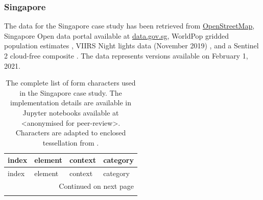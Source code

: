 \subsubsection{Singapore}
The data for the Singapore case study has been retrieved from
\href{https://osm.org}{OpenStreetMap}, Singapore Open data portal available at
\href{https://data.gov.sg/}{data.gov.sg}, WorldPop gridded population estimates
\citep{bondarenko2020census}, VIIRS Night lights data (November 2019) \citep{elvidge2013viirs},
and a Sentinel 2 cloud-free composite \citep{CORBANE2020105737}. The data represents
versions available on February 1, 2021.


\begin{longtable}{p{5cm}p{4cm}p{4cm}l}
    \caption{The complete list of form characters used in the Singapore case study. The implementation details are available
    in Jupyter notebooks available at <anonymised for peer-review>.
    Characters are adapted to enclosed tessellation from \cite{fleischmann2021methodological}.}
    \label{tab:form_sin} \\
    \toprule
                                   index &                         element &                    context &     category \\
    \midrule
    \endfirsthead

    \toprule
                                   index &                         element &                    context &     category \\
    \midrule
    \endhead
    \midrule
    \multicolumn{4}{r}{{Continued on next page}} \\
    \midrule
    \endfoot


\end{longtable}
